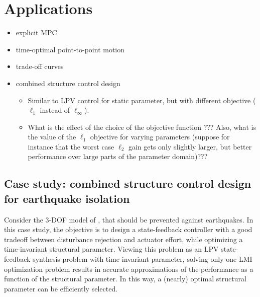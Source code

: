 \documentclass{article}
\begin{document}
\section{Applications}

\begin{itemize}
\item explicit MPC
\item time-optimal point-to-point motion
\item trade-off curves
\item combined structure control design
    \begin{itemize}
    \item Similar to LPV control for static parameter, but with different objective ($\ell_1$ instead of $\ell_\infty$).
    \item What is the effect of the choice of the objective function ??? Also, what is the value of the $\ell_1$ objective for varying parameters (suppose for instance that the worst case $\ell_2$ gain gets only slightly larger, but better performance over large parts of the parameter domain)???
    \end{itemize}
\end{itemize}

\subsection{Case study: combined structure control design for earthquake isolation}
Consider the 3-DOF model of \cite{Camino_2003}, that should be prevented against earthquakes. In this case study, the objective is to design a state-feedback controller with a good tradeoff between disturbance rejection and actuator effort, while optimizing a time-invariant structural parameter. Viewing this problem as an LPV state-feedback synthesis problem with time-invariant parameter, solving only one LMI optimization problem results in accurate approximations of the performance as a function of the structural parameter. In this way, a (nearly) optimal structural parameter can be efficiently selected.
\end{document}
